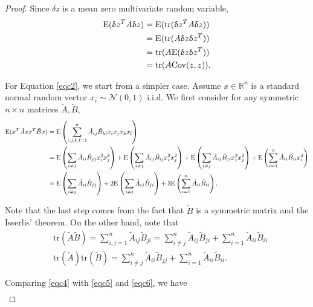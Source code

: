 \documentclass[article,ij4uq]{ij4uq}              %
\begin{document}
\begin{proof}
Since $\delta z$ is a mean zero multivariate random variable,
\begin{align}
    \mathrm{E}(\delta z^{T}A\delta z)&=\mathrm{E}(\mathrm{tr}(\delta z^{T}A\delta z))\notag\\
    &=\mathrm{E}(\mathrm{tr}(A\delta z\delta z^{T}))\notag\\
    &=\mathrm{tr}(A\mathrm{E}(\delta z\delta z^{T}))\notag\\
    &=\mathrm{tr}(A\mathrm{Cov}(z,z)).\label{eqc3}
\end{align}
\par For Equation \eqref{eqc2}, we start from a simpler case. Assume $x\in \mathbb{R}^{n}$ is a standard normal random vector $x_{i}\sim \mathcal{N}(0,1)$ i.i.d. We first consider for any symmetric $n\times n$ matrices $\tilde{A},\tilde{B}$, 
\begin{align}
    \mathrm{E}(x^{T}\tilde{A}xx^{T}\tilde{B}x)&=\mathrm{E}\left(\sum_{i,j,k,l=1}^{n}\tilde{A}_{ij}\tilde{B}_{kl}x_{i}x_{j}x_{k}x_{l}\right)\notag\\
    &=\mathrm{E}\left(\sum_{i\neq j}\tilde{A}_{ii}\tilde{B}_{jj}x_{i}^{2}x_{j}^{2}\right)+\mathrm{E}\left(\sum_{i\neq j}\tilde{A}_{ij}\tilde{B}_{ij}x_{i}^{2}x_{j}^{2}\right)+\mathrm{E}\left(\sum_{i\neq j}\tilde{A}_{ij}\tilde{B}_{ji}x_{i}^{2}x_{j}^{2}\right)+\mathrm{E}\left(\sum_{i=1}^{n}\tilde{A}_{ii}\tilde{B}_{ii}x_{i}^{4}\right)\notag\\
    &=\mathrm{E}\left(\sum_{i\neq j}\tilde{A}_{ii}\tilde{B}_{jj}\right)+2\mathrm{E}\left(\sum_{i\neq j}\tilde{A}_{ij}\tilde{B}_{ji}\right)+3\mathrm{E}\left(\sum_{i=1}^{n}\tilde{A}_{ii}\tilde{B}_{ii}\right).\label{eqc4}
\end{align}
\par Note that the last step comes from the fact that $\tilde{B}$ is a symmetric matrix and the Isserlis' theorem. On the other hand, note that
\begin{align}
    &\mathrm{tr}(\tilde{A}\tilde{B})=\sum_{i,j=1}^{n}\tilde{A}_{ij}\tilde{B}_{ji}=\sum_{i\neq j}^{n}\tilde{A}_{ij}\tilde{B}_{ji}+\sum_{i=1}^{n}\tilde{A}_{ii}\tilde{B}_{ii}\label{eqc5}\\
    &\mathrm{tr}(\tilde{A})\mathrm{tr}(\tilde{B})=\sum_{i\neq j}^{n}\tilde{A}_{ii}\tilde{B}_{jj}+\sum_{i=1}^{n}\tilde{A}_{ii}\tilde{B}_{ii}.\label{eqc6}
\end{align}
\par Comparing \eqref{eqc4} with \eqref{eqc5} and \eqref{eqc6},  we have
\begin{align}

\end{align}
\end{proof}
\end{document}
